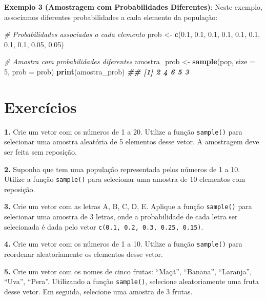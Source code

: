 \documentclass[
]{book}
\newenvironment{Shaded}{\begin{snugshade}}{\end{snugshade}}
\newcommand{\AttributeTok}[1]{\textcolor[rgb]{0.13,0.29,0.53}{#1}}
\newcommand{\CommentTok}[1]{\textcolor[rgb]{0.56,0.35,0.01}{\textit{#1}}}
\newcommand{\DecValTok}[1]{\textcolor[rgb]{0.00,0.00,0.81}{#1}}
\newcommand{\DocumentationTok}[1]{\textcolor[rgb]{0.56,0.35,0.01}{\textbf{\textit{#1}}}}
\newcommand{\FloatTok}[1]{\textcolor[rgb]{0.00,0.00,0.81}{#1}}
\newcommand{\FunctionTok}[1]{\textcolor[rgb]{0.13,0.29,0.53}{\textbf{#1}}}
\newcommand{\NormalTok}[1]{#1}
\newcommand{\OtherTok}[1]{\textcolor[rgb]{0.56,0.35,0.01}{#1}}
\begin{document}
\textbf{Exemplo 3 (Amostragem com Probabilidades Diferentes)}: Neste exemplo,
associamos diferentes probabilidades a cada elemento da população:

\begin{Shaded}
\begin{Highlighting}[]
\CommentTok{\# Probabilidades associadas a cada elemento}
\NormalTok{prob }\OtherTok{\textless{}{-}} \FunctionTok{c}\NormalTok{(}\FloatTok{0.1}\NormalTok{, }\FloatTok{0.1}\NormalTok{, }\FloatTok{0.1}\NormalTok{, }\FloatTok{0.1}\NormalTok{, }\FloatTok{0.1}\NormalTok{, }\FloatTok{0.1}\NormalTok{, }\FloatTok{0.1}\NormalTok{, }\FloatTok{0.1}\NormalTok{, }\FloatTok{0.05}\NormalTok{, }\FloatTok{0.05}\NormalTok{)}

\CommentTok{\# Amostra com probabilidades diferentes}
\NormalTok{amostra\_prob }\OtherTok{\textless{}{-}} \FunctionTok{sample}\NormalTok{(pop, }\AttributeTok{size =} \DecValTok{5}\NormalTok{, }\AttributeTok{prob =}\NormalTok{ prob)}
\FunctionTok{print}\NormalTok{(amostra\_prob)}
\DocumentationTok{\#\# [1] 2 4 6 5 3}
\end{Highlighting}
\end{Shaded}

\section{Exercícios}\label{exercuxedcios-20}

\textbf{1.} Crie um vetor com os números de 1 a 20. Utilize a função
\texttt{sample()} para selecionar uma amostra aleatória de 5 elementos desse
vetor. A amostragem deve ser feita sem reposição.

\textbf{2.} Suponha que tem uma população representada pelos números de 1 a
10. Utilize a função \texttt{sample()} para selecionar uma amostra de 10
elementos com reposição.

\textbf{3.} Crie um vetor com as letras A, B, C, D, E. Aplique a função
\texttt{sample()} para selecionar uma amostra de 3 letras, onde a probabilidade
de cada letra ser selecionada é dada pelo vetor
\texttt{c(0.1,\ 0.2,\ 0.3,\ 0.25,\ 0.15)}.

\textbf{4.} Crie um vetor com os números de 1 a 10. Utilize a função
\texttt{sample()} para reordenar aleatoriamente os elementos desse vetor.

\textbf{5.} Crie um vetor com os nomes de cinco frutas: ``Maçã'', ``Banana'',
``Laranja'', ``Uva'', ``Pera''. Utilizando a função \texttt{sample()}, selecione
aleatoriamente uma fruta desse vetor. Em seguida, selecione uma amostra
de 3 frutas.
\end{document}
